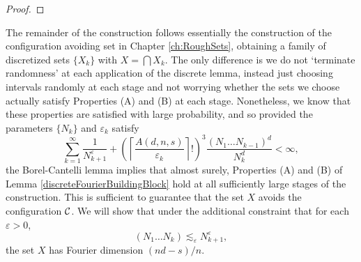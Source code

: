 \begin{proof}
\begin{comment}
    Now fix $m \in \{ -N_1 \dots N_{k+1}, N_1 \dots N_{k+1} \}^d$.



    We can then apply Hoeffding's inequality to conclude that for each $t > 0$,
    \begin{align*}
        \PP \left( |\widehat{\nu_S}(m)| \geq \frac{t p \cdot \#(\DQ_{k+1}(T))^{1/2}}{\#(\DQ_{k+1}(S))} \right) &= \PP \left( \sum \left| \#(\DQ_{k+1}(S)) A_Q e^{-\frac{2 \pi i m \cdot a(Q)}{N_1 \dots N_{k+1}}} \right| \geq A \right) \\
        &\leq 2 \cdot \exp \left( - 2 t^2) \right)
    \end{align*}
    If we now take a union bound over all $m \in \{ -N_1 \dots N_{k+1}, \dots, N_1 \dots N_{k+1} \}^d$, we can guarantee that
    \begin{equation} \label{fourierdim3}
        \mathbf{P} \left( |\widehat{f}(m)| \leq \log(N_{k+1})/S\ \text{for all $m \in \{ -N, \dots, N\}^d$} \right) \geq 1 - 2^{d+1}/N^{c \log N - d}.
    \end{equation}
    Since $\widehat{\nu_S}$ is $N_1 \dots N_{k+1}$ periodic, this means we can control all integer values of $\widehat{\nu_S}$ with high probability.

    Combining \eqref{fourierdim1}, \eqref{fourierdim2}, and \eqref{fourierdim3}, we conclude that there exists a constant $C$ such that with probability at least
    \[ 1 - 2 \exp \left( \frac{-N^{d-s/n}}{A^{1/n} (\log N)^{1/n}} \right) - 1/\log N - \frac{2^{d+1}}{N^{c \log N - d}} \geq 1 - C / \log N, \]
    the set $X$ avoids $K$, and for all $m \in \{ -N, \dots, N \}^d$,
    \[ |\widehat{f}(m)| \leq \frac{C (\log N)^{1-1/n}}{N^{d-s/n}}. \qedhere \]
\end{comment}
\end{proof}

The remainder of the construction follows essentially the construction of the configuration avoiding set in Chapter \ref{ch:RoughSets}, obtaining a family of discretized sets $\{ X_k \}$ with $X = \bigcap X_k$. The only difference is we do not `terminate randomness' at each application of the discrete lemma, instead just choosing intervals randomly at each stage and not worrying whether the sets we choose actually satisfy Properties (A) and (B) at each stage. Nonetheless, we know that these properties are satisfied with large probability, and so provided the parameters $\{ N_k \}$ and $\varepsilon_k$ satisfy
%
\[ \sum_{k = 1}^\infty \frac{1}{N_{k+1}^\varepsilon} + \left( \left\lceil \frac{A(d,n,s)}{\varepsilon_k} \right\rceil ! \right)^3 \frac{(N_1 \dots N_{k-1})^d}{N_k^d} < \infty, \]
%
the Borel-Cantelli lemma implies that almost surely, Properties (A) and (B) of Lemma \ref{discreteFourierBuildingBlock} hold at all sufficiently large stages of the construction. This is sufficient to guarantee that the set $X$ avoids the configuration $\operatorname{\mathcal{C}}$. We will show that under the additional constraint that for each $\varepsilon > 0$,
%
\begin{equation} \label{equation41028694692} (N_1 \dots N_k) \lesssim_\varepsilon N_{k+1}^\varepsilon, \end{equation}
%
the set $X$ has Fourier dimension $(nd - s)/n$.


